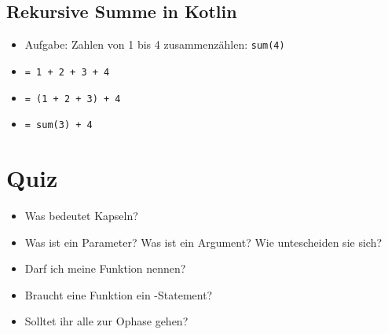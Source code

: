 \begin{frame}
    \slidehead
    \centering
    \vspace{-0.1cm}
\end{frame}

\subsection{Rekursive Summe in Kotlin}
\begin{frame}
    \slidehead

    \begin{itemize}
        \item Aufgabe: Zahlen von 1 bis 4 zusammenzählen: \texttt{sum(4)} \pause
        \item \texttt{= 1 + 2 + 3 + 4} \pause
        \item \texttt{= (1 + 2 + 3) + 4} \pause
        \item \texttt{= sum(3) + 4}
    \end{itemize}
    \vspace{1em}
    \pause
\end{frame}

\livecoding


\subsection{}

\section{Quiz}
\begin{frame}
    \slidehead
    \begin{itemize}
        \item Was bedeutet Kapseln?
            \pause
        \item Was ist ein Parameter?
            Was ist ein Argument?
            Wie untescheiden sie sich?
            \pause
        \item Darf ich meine Funktion  nennen?
            \pause
        \item Braucht eine Funktion ein -Statement?
            \pause
        \item Solltet ihr alle zur Ophase gehen?
    \end{itemize}
\end{frame}

